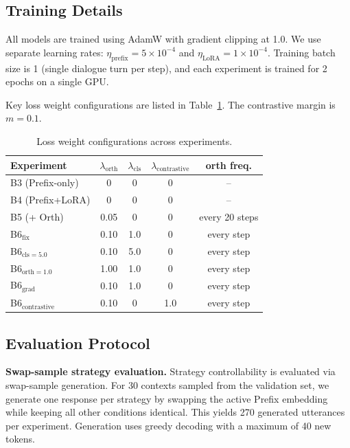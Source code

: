 \documentclass[conference]{IEEEtran}
\begin{document}
\subsection{Training Details}

All models are trained using AdamW with gradient clipping at 1.0. We use separate learning rates: $\eta_{\text{prefix}} = 5 \times 10^{-4}$ and $\eta_{\text{LoRA}} = 1 \times 10^{-4}$. Training batch size is 1 (single dialogue turn per step), and each experiment is trained for 2 epochs on a single GPU.

Key loss weight configurations are listed in Table~\ref{tab:loss_weights}. The contrastive margin is $m = 0.1$.

\begin{table}[t]
\centering
\caption{Loss weight configurations across experiments.}
\label{tab:loss_weights}
\begin{tabular}{lcccc}
\toprule
\textbf{Experiment} & $\lambda_{\text{orth}}$ & $\lambda_{\text{cls}}$ & $\lambda_{\text{contrastive}}$ & \textbf{orth freq.} \\
\midrule
B3 (Prefix-only)  & 0    & 0   & 0  & -- \\
B4 (Prefix+LoRA)  & 0    & 0   & 0  & -- \\
B5 (+ Orth)       & 0.05 & 0   & 0  & every 20 steps \\
B6$_{\text{fix}}$ & 0.10 & 1.0 & 0  & every step \\
B6$_{\text{cls}=5.0}$    & 0.10 & 5.0 & 0 & every step \\
B6$_{\text{orth}=1.0}$   & 1.00 & 1.0 & 0 & every step \\
B6$_{\text{grad}}$       & 0.10 & 1.0 & 0 & every step \\
B6$_{\text{contrastive}}$& 0.10 & 0   & 1.0& every step \\
\bottomrule
\end{tabular}
\end{table}

\subsection{Evaluation Protocol}

\textbf{Swap-sample strategy evaluation.} Strategy controllability is evaluated via swap-sample generation. For 30 contexts sampled from the validation set, we generate one response per strategy by swapping the active Prefix embedding while keeping all other conditions identical. This yields 270 generated utterances per experiment. Generation uses greedy decoding with a maximum of 40 new tokens.
\end{document}

